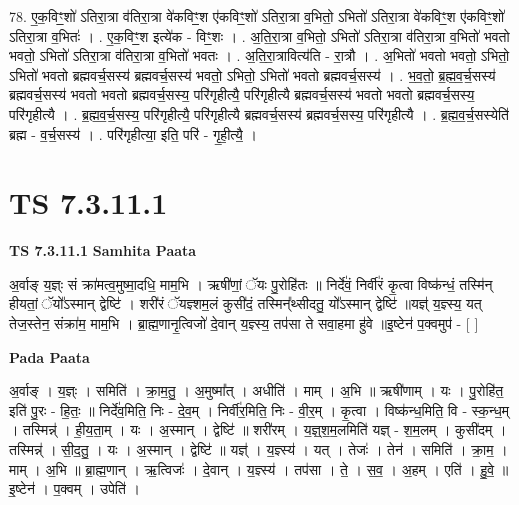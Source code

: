 \documentclass[17pt]{extarticle}
\begin{document}
78. ए॒क॒विꣳ॒॒शो॑ ऽतिरा॒त्रा व॑तिरा॒त्रा वे॑कविꣳ॒॒श ए॑कविꣳ॒॒शो॑ ऽतिरा॒त्रा व॒भितो॒ ऽभितो॑ ऽतिरा॒त्रा वे॑कविꣳ॒॒श ए॑कविꣳ॒॒शो॑ ऽतिरा॒त्रा व॒भितः॑ । . ए॒क॒विꣳ॒॒श इत्ये॑क - विꣳ॒॒शः । . अ॒ति॒रा॒त्रा व॒भितो॒ ऽभितो॑ ऽतिरा॒त्रा व॑तिरा॒त्रा व॒भितो॑ भवतो भवतो॒ ऽभितो॑ ऽतिरा॒त्रा व॑तिरा॒त्रा व॒भितो॑ भवतः । . अ॒ति॒रा॒त्रावित्य॑ति - रा॒त्रौ । . अ॒भितो॑ भवतो भवतो॒ ऽभितो॒ ऽभितो॑ भवतो ब्रह्मवर्च॒सस्य॑ ब्रह्मवर्च॒सस्य॑ भवतो॒ ऽभितो॒ ऽभितो॑ भवतो ब्रह्मवर्च॒सस्य॑ । . भ॒व॒तो॒ ब्र॒ह्म॒व॒र्च॒सस्य॑ ब्रह्मवर्च॒सस्य॑ भवतो भवतो ब्रह्मवर्च॒सस्य॒ परि॑गृहीत्यै॒ परि॑गृहीत्यै ब्रह्मवर्च॒सस्य॑ भवतो भवतो ब्रह्मवर्च॒सस्य॒ परि॑गृहीत्यै । . ब्र॒ह्म॒व॒र्च॒सस्य॒ परि॑गृहीत्यै॒ परि॑गृहीत्यै ब्रह्मवर्च॒सस्य॑ ब्रह्मवर्च॒सस्य॒ परि॑गृहीत्यै । . ब्र॒ह्म॒व॒र्च॒सस्येति॑ ब्रह्म - व॒र्च॒सस्य॑ । . परि॑गृहीत्या॒ इति॒ परि॑ - गृ॒ही॒त्यै॒ । \newline
\pagebreak
{}

\section{ TS 7.3.11.1 }

\textbf{TS 7.3.11.1 } \newline
\textbf{Samhita Paata} \newline

अ॒र्वाङ् य॒ज्ञ्ः सं क्रा॑मत्व॒मुष्मा॒दधि॒ माम॒भि । ऋषी॑णां॒ ॅयः पु॒रोहि॑तः ॥ निर्दे॑वं॒ निर्वी॑रं कृ॒त्वा विष्क॑न्धं॒ तस्मि॑न् हीयतां॒ ॅयो᳚ऽस्मान् द्वेष्टि॑ । शरी॑रं ॅयज्ञ्शम॒लं कुसी॑दं॒ तस्मिन्᳚थ्सीदतु॒ यो᳚ऽस्मान् द्वेष्टि॑ ॥यज्ञ्॑ य॒ज्ञ्स्य॒ यत् तेज॒स्तेन॒ संक्रा॑म॒ माम॒भि । ब्रा॒ह्म॒णानृ॒त्विजो॑ दे॒वान् य॒ज्ञ्स्य॒ तप॑सा ते सवा॒हमा हु॑वे ॥इ॒ष्टेन॑ प॒क्वमुप॑ - [  ] \newline

\textbf{Pada Paata} \newline

अ॒र्वाङ् । य॒ज्ञ्ः । समिति॑ । क्रा॒म॒तु॒ । अ॒मुष्मा᳚त् । अधीति॑ । माम् । अ॒भि ॥ ऋषी॑णाम् । यः । पु॒रोहि॑त॒ इति॑ पु॒रः - हि॒तः॒ ॥ निर्दे॑व॒मिति॒ निः - दे॒व॒म् । निर्वी॑र॒मिति॒ निः - वी॒र॒म् । कृ॒त्वा । विष्क॑न्ध॒मिति॒ वि - स्क॒न्ध॒म् । तस्मिन्न्॑ । ही॒य॒ता॒म् । यः । अ॒स्मान् । द्वेष्टि॑ ॥ शरी॑रम् । य॒ज्ञ्॒श॒म॒लमिति॑ यज्ञ् - श॒म॒लम् । कुसी॑दम् । तस्मिन्न्॑ । सी॒द॒तु॒ । यः । अ॒स्मान् । द्वेष्टि॑ ॥ यज्ञ्॑ । य॒ज्ञ्स्य॑ । यत् । तेजः॑ । तेन॑ । समिति॑ । क्रा॒म॒ । माम् । अ॒भि ॥ ब्रा॒ह्म॒णान् । ऋ॒त्विजः॑ । दे॒वान् । य॒ज्ञ्स्य॑ । तप॑सा । ते॒ । स॒व॒ । अ॒हम् । एति॑ । हु॒वे॒ ॥ इ॒ष्टेन॑ । प॒क्वम् । उपेति॑ ।  \newline
\end{document}
